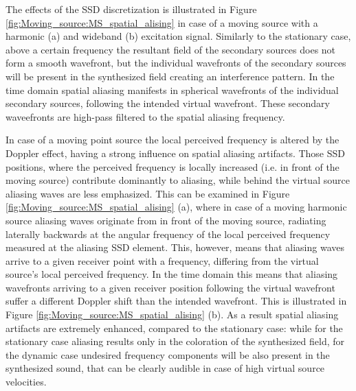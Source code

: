 The effects of the SSD discretization is illustrated in Figure \ref{fig:Moving_source:MS_spatial_alising} in case of a moving source with a harmonic (a) and wideband (b) excitation signal.
Similarly to the stationary case, above a certain frequency the resultant field of the secondary sources does not form a smooth wavefront, but the individual wavefronts of the secondary sources will be present in the synthesized field creating an interference pattern.
In the time domain spatial aliasing manifests in spherical wavefronts of the individual secondary sources, following the intended virtual wavefront.
These secondary waveefronts are high-pass filtered to the spatial aliasing frequency.

In case of a moving point source the local perceived frequency is altered by the Doppler effect, having a strong influence on spatial aliasing artifacts.
Those SSD positions, where the perceived frequency is locally increased (i.e. in front of the moving source) contribute dominantly to aliasing, while behind the virtual source aliasing waves are less emphasized.
This can be examined in Figure \ref{fig:Moving_source:MS_spatial_alising} (a), where in case of a moving harmonic source aliasing waves originate from in front of the moving source, radiating laterally backwards at the angular frequency of the local perceived frequency measured at the aliasing SSD element.
This, however, means that aliasing waves arrive to a given receiver point with a frequency, differing from the virtual source's local perceived frequency.
In the time domain this means that aliasing wavefronts arriving to a given receiver position following the virtual wavefront suffer a different Doppler shift than the intended wavefront.
This is illustrated in Figure \ref{fig:Moving_source:MS_spatial_alising} (b).
As a result spatial aliasing artifacts are extremely enhanced, compared to the stationary case: while for the stationary case aliasing results only in the coloration of the synthesized field, for the dynamic case undesired frequency components will be also present in the synthesized sound, that can be clearly audible in case of high virtual source velocities.


